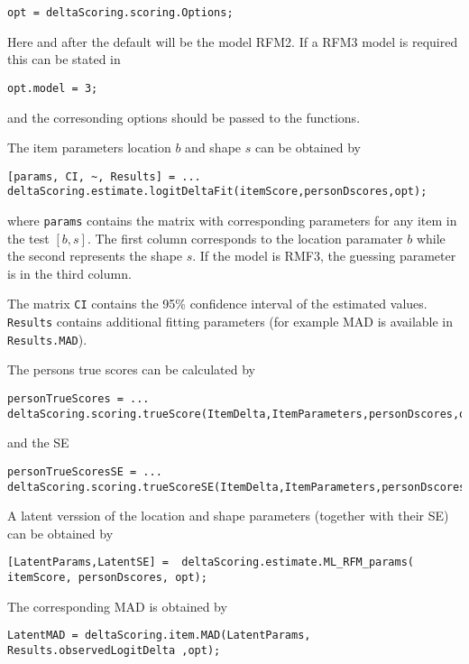 \documentclass[12pt]{article}
\begin{document}
\begin{lstlisting}[style=Matlab-bw]
opt = deltaScoring.scoring.Options;
\end{lstlisting}

Here and after the default will be the model RFM2. If a RFM3 model is required this can be stated in 

\begin{lstlisting}[style=Matlab-bw]
opt.model = 3;
\end{lstlisting}

and the corresonding options should be passed to the functions.

The item parameters location $b$ and shape $s$ can be obtained by

\begin{lstlisting}[style=Matlab-bw]
[params, CI, ~, Results] = ...
deltaScoring.estimate.logitDeltaFit(itemScore,personDscores,opt);
\end{lstlisting}

where {\tt params} contains the matrix with corresponding parameters for any item in the test $[b,s]$. The first column corresponds to the location paramater  $b$ while the second represents the shape $s$. If the model is RMF3, the guessing parameter is in the third column.

The matrix {\tt CI} contains the 95\% confidence interval of the estimated values. {\tt Results} contains additional fitting parameters (for example MAD is available in {\tt Results.MAD}).

The persons true scores can be calculated by
\begin{lstlisting}[style=Matlab-bw]
personTrueScores = ...
deltaScoring.scoring.trueScore(ItemDelta,ItemParameters,personDscores,opt);
\end{lstlisting}

and the SE 

\begin{lstlisting}[style=Matlab-bw]
personTrueScoresSE = ...
deltaScoring.scoring.trueScoreSE(ItemDelta,ItemParameters,personDscores,opt);
\end{lstlisting}


A latent verssion of the location and shape parameters (together with their SE) can be obtained by 
\begin{lstlisting}[style=Matlab-bw]
[LatentParams,LatentSE] =  deltaScoring.estimate.ML_RFM_params( itemScore, personDscores, opt);
\end{lstlisting}

The corresponding MAD is obtained by
\begin{lstlisting}[style=Matlab-bw]
LatentMAD = deltaScoring.item.MAD(LatentParams, Results.observedLogitDelta ,opt);
\end{lstlisting}
\end{document}
